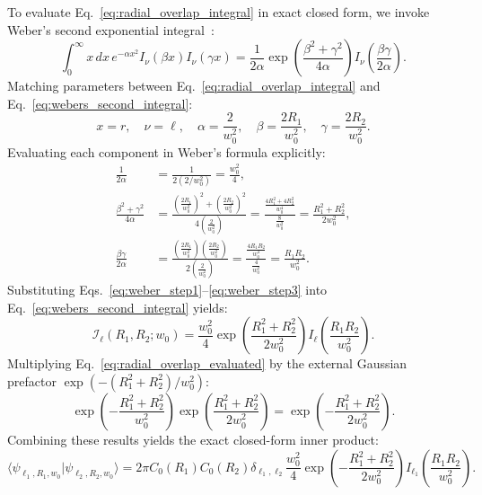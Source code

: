 \documentclass{optica-article}
\begin{document}
To evaluate Eq.~\eqref{eq:radial_overlap_integral} in exact closed form, we invoke Weber's second exponential integral~\cite{Gradshteyn2014}:
\begin{equation}
\int_0^\infty x \, dx \, e^{-\alpha x^2} I_\nu(\beta x) I_\nu(\gamma x) = \frac{1}{2\alpha} \exp\left( \frac{\beta^2 + \gamma^2}{4\alpha} \right) I_\nu\left( \frac{\beta \gamma}{2\alpha} \right).
\label{eq:webers_second_integral}
\end{equation}
Matching parameters between Eq.~\eqref{eq:radial_overlap_integral} and Eq.~\eqref{eq:webers_second_integral}:
\begin{equation}
x = r, \quad \nu = \ell, \quad \alpha = \frac{2}{w_0^2}, \quad \beta = \frac{2 R_1}{w_0^2}, \quad \gamma = \frac{2 R_2}{w_0^2}.
\label{eq:weber_parameter_identification}
\end{equation}
Evaluating each component in Weber's formula explicitly:
\begin{align}
\frac{1}{2\alpha} &= \frac{1}{2(2 / w_0^2)} = \frac{w_0^2}{4}, \label{eq:weber_step1} \\
\frac{\beta^2 + \gamma^2}{4\alpha} &= \frac{\left( \frac{2 R_1}{w_0^2} \right)^2 + \left( \frac{2 R_2}{w_0^2} \right)^2}{4\left( \frac{2}{w_0^2} \right)} = \frac{\frac{4 R_1^2 + 4 R_2^2}{w_0^4}}{\frac{8}{w_0^2}} = \frac{R_1^2 + R_2^2}{2 w_0^2}, \label{eq:weber_step2} \\
\frac{\beta \gamma}{2\alpha} &= \frac{\left( \frac{2 R_1}{w_0^2} \right) \left( \frac{2 R_2}{w_0^2} \right)}{2\left( \frac{2}{w_0^2} \right)} = \frac{\frac{4 R_1 R_2}{w_0^4}}{\frac{4}{w_0^2}} = \frac{R_1 R_2}{w_0^2}. \label{eq:weber_step3}
\end{align}
Substituting Eqs.~\eqref{eq:weber_step1}--\eqref{eq:weber_step3} into Eq.~\eqref{eq:webers_second_integral} yields:
\begin{equation}
\mathcal{I}_\ell(R_1, R_2; w_0) = \frac{w_0^2}{4} \exp\left( \frac{R_1^2 + R_2^2}{2 w_0^2} \right) I_\ell\left( \frac{R_1 R_2}{w_0^2} \right).
\label{eq:radial_overlap_evaluated}
\end{equation}
Multiplying Eq.~\eqref{eq:radial_overlap_evaluated} by the external Gaussian prefactor $\exp(-(R_1^2 + R_2^2) / w_0^2)$:
\begin{equation}
\exp\left( - \frac{R_1^2 + R_2^2}{w_0^2} \right) \exp\left( \frac{R_1^2 + R_2^2}{2 w_0^2} \right) = \exp\left( - \frac{R_1^2 + R_2^2}{2 w_0^2} \right).
\label{eq:prefactor_multiplication}
\end{equation}
Combining these results yields the exact closed-form inner product:
\begin{equation}
\boxed{\langle \psi_{\ell_1, R_1, w_0} | \psi_{\ell_2, R_2, w_0} \rangle = 2\pi C_0(R_1) C_0(R_2) \delta_{\ell_1, \ell_2} \frac{w_0^2}{4} \exp\left( - \frac{R_1^2 + R_2^2}{2 w_0^2} \right) I_{\ell_1}\left( \frac{R_1 R_2}{w_0^2} \right).}
\label{eq:exact_inner_product}
\end{equation}
\end{document}
